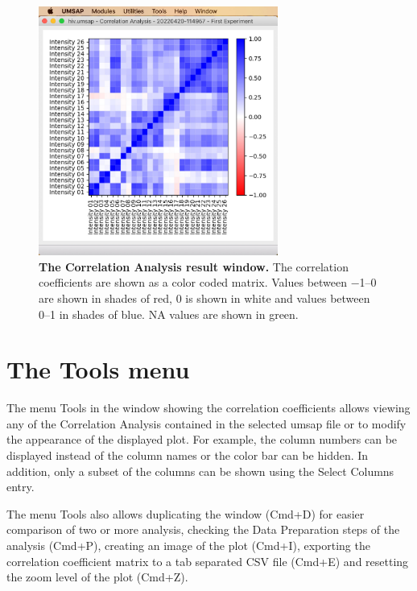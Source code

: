 \begin{figure}[ht]
    \centering
    \includegraphics[width=0.7\textwidth]{./IMAGES/UTIL-CORR-WINDOW/util-corr-res.jpg}
    \caption[The Correlation Analysis result window]{\textbf{The Correlation Analysis
    result window.} The correlation coefficients are shown as a color coded matrix.
    Values between \numrange{-1}{0} are shown in shades of red, \num{0} is shown in
    white and values between \numrange{0}{1} in shades of blue. NA values are shown
    in green.}
    \label{fig:utilCorrAnalysisRes}
    \vspace{-5pt} 	
\end{figure} 

\section{The Tools menu}

The menu Tools in the window showing the correlation coefficients allows viewing
any of the Correlation Analysis contained in the selected umsap file or to
modify the appearance of the displayed plot. For example, the column numbers can
be displayed instead of the column names or the color bar can be hidden. In addition,
only a subset of the columns can be shown using the Select Columns entry.

The menu Tools also allows duplicating the window (Cmd+D) for easier comparison of
two or more analysis, checking the Data Preparation steps of the analysis (Cmd+P),
creating an image of the plot (Cmd+I), exporting the correlation coefficient matrix
to a tab separated CSV file (Cmd+E) and resetting the zoom level of the plot (Cmd+Z).

